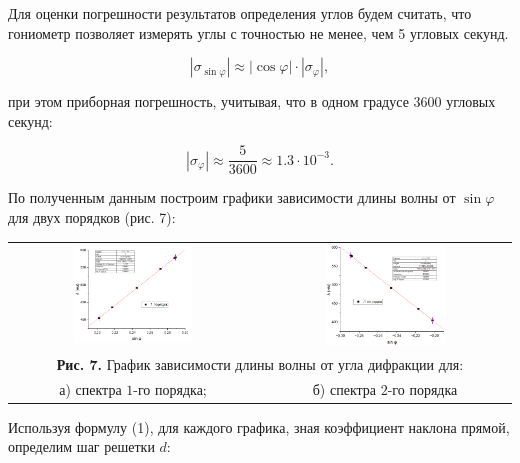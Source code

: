 \documentclass[a4paper,12pt]{article} %
\begin{document}
\hfill \break Для оценки погрешности результатов определения углов будем считать, что гониометр позволяет измерять углы с точностью не менее, чем 5 угловых секунд.

$$|\sigma_{\sin{\varphi}}| \approx |\cos{\varphi}| \cdot |\sigma_{\varphi}|,$$

\hfill \break при этом приборная погрешность, учитывая, что в одном градусе 3600 угловых секунд:

$$|\sigma_{\varphi}| \approx \frac{5}{3600} \approx 1.3 \cdot 10^{-3}.$$

\hfill \break По полученным данным построим графики зависимости длины волны от $\sin{\varphi}$ для двух порядков (рис. 7):

\hfill \break \begin{center}
\begin{tabular}{cc}
\includegraphics[width=0.5\textwidth]{4.4.1_6.png}&\includegraphics[width=0.5\textwidth]{4.4.1_7.png}\\
\multicolumn{2}{c}{\textbf{Рис. 7.} График зависимости длины волны от угла дифракции для:}\\
а) спектра $1$-го порядка; & б) спектра $2$-го порядка\\
\end{tabular}
\end{center}

\hfill \break Используя формулу (1), для каждого графика, зная коэффициент наклона прямой, определим шаг решетки $d$:
\end{document}

